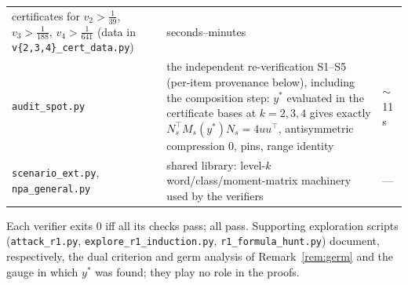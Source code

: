 \documentclass[11pt]{article}
\begin{document}
\begin{center}
\begin{tabular}{@{}>{\raggedright\arraybackslash}p{4.4cm}>{\raggedright\arraybackslash}p{7.8cm}l@{}}
certificates for $v_2>\tfrac1{39}$, $v_3>\tfrac1{188}$,
$v_4>\tfrac1{641}$ (data in \texttt{v\{2,3,4\}\_cert\_data.py}) &
seconds--minutes\\
\texttt{audit\_spot.py} & the independent re-verification S1--S5 (per-item
provenance below), including the composition step: $y^\ast$ evaluated in
the certificate bases at $k=2,3,4$ gives exactly
$N_s^\top M_s(y^\ast)N_s=4uu^\top$, antisymmetric compression $0$, pins,
range identity & $\sim$11\,s\\
\texttt{scenario\_ext.py}, \texttt{npa\_general.py} & shared library:
level-$k$ word/class/moment-matrix machinery used by the verifiers &
---\\
\bottomrule
\end{tabular}
\end{center}

Each verifier exits $0$ iff all its checks pass; all pass. Supporting
exploration scripts (\texttt{attack\_r1.py},
\texttt{explore\_r1\_induction.py},
\texttt{r1\_formula\_hunt.py}) document, respectively, the dual criterion
and germ analysis of Remark~\ref{rem:germ} and the gauge in which
$y^\ast$ was found; they play no role in the proofs.
\end{document}
